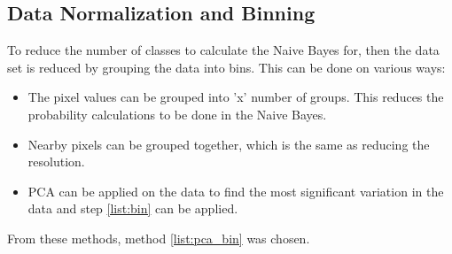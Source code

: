 \subsection{Data Normalization and Binning}

To reduce the number of classes to calculate the Naive Bayes for, then the data set is reduced by grouping the data into bins.
This can be done on various ways:

\begin{itemize}
\item The pixel values can be grouped into 'x' number of groups.
This reduces the probability calculations to be done in the Naive Bayes. \label{list:bin}
\item Nearby pixels can be grouped together, which is the same as reducing the resolution.
\item PCA can be applied on the data to find the most significant variation in the data and step \ref{list:bin} can be applied. \label{list:pca_bin}
\end{itemize}

From these methods, method \ref{list:pca_bin} was chosen.

